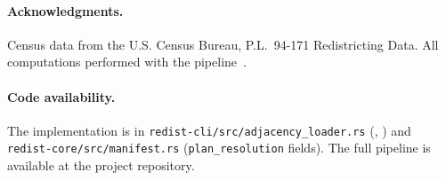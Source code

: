 \paragraph{Acknowledgments.}
Census data from the U.S. Census Bureau, P.L.\ 94-171 Redistricting Data.
All computations performed with the \redist{} pipeline~\citep{dellaLibera2026b1}.

\paragraph{Code availability.}
The implementation is in \texttt{redist-cli/src/adjacency\_loader.rs}
(\derive{}, \buildc{}) and \texttt{redist-core/src/manifest.rs}
(\texttt{plan\_resolution} fields).
The full pipeline is available at the project repository.
